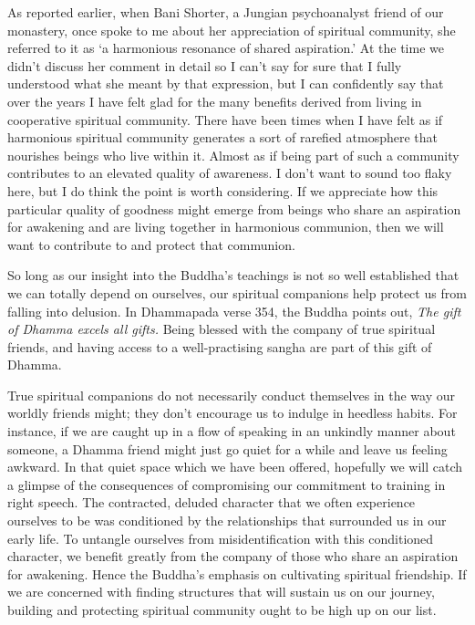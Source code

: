 As reported earlier, when Bani Shorter, a Jungian psychoanalyst friend of our monastery, once
spoke to me about her appreciation of spiritual community, she referred
to it as `a harmonious resonance of shared aspiration.' At the time we
didn't discuss her comment in detail so I can't say for sure that I
fully understood what she meant by that expression, but I can
confidently say that over the years I have felt glad for the many
benefits derived from living in cooperative spiritual community. There
have been times when I have felt as if harmonious spiritual community
generates a sort of rarefied atmosphere that nourishes beings who live
within it. Almost as if being part of such a community contributes to an
elevated quality of awareness. I don't want to sound too flaky here, but
I do think the point is worth considering. If we appreciate how this
particular quality of goodness might emerge from beings who share an
aspiration for awakening and are living together in harmonious
communion, then we will want to contribute to and protect that
communion.

So long as our insight into the Buddha's teachings is not so well
established that we can totally depend on ourselves, our spiritual
companions help protect us from falling into delusion. In Dhammapada
verse 354, the Buddha points out, \emph{The gift of Dhamma excels all
gifts.} Being blessed with the company of true spiritual friends, and
having access to a well-practising sangha are part of this gift of
Dhamma.

True spiritual companions do not necessarily conduct themselves in the
way our worldly friends might; they don't encourage us to indulge in
heedless habits. For instance, if we are caught up in a flow of speaking
in an unkindly manner about someone, a Dhamma friend might just go quiet
for a while and leave us feeling awkward. In that quiet space which we
have been offered, hopefully we will catch a glimpse of the consequences
of compromising our commitment to training in right speech. The
contracted, deluded character that we often experience ourselves to be
was conditioned by the relationships that surrounded us in our early
life. To untangle ourselves from misidentification with this conditioned
character, we benefit greatly from the company of those who share an
aspiration for awakening. Hence the Buddha's emphasis on cultivating
spiritual friendship\cite{friendship}. If we are concerned with finding structures that
will sustain us on our journey, building and protecting spiritual
community ought to be high up on our list.


